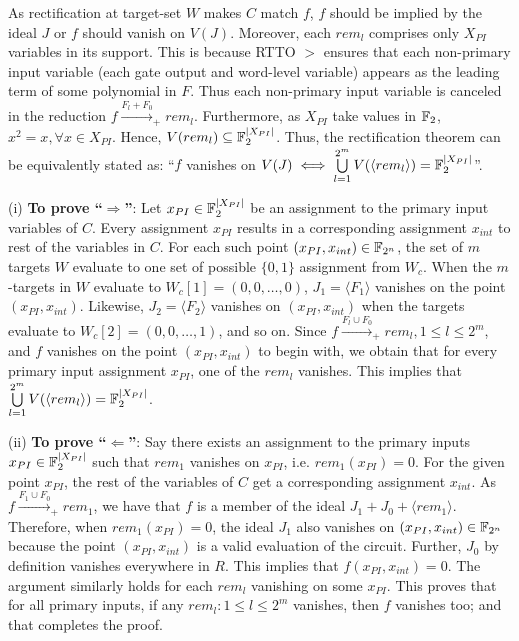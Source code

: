 \begin{Proof}
As rectification at target-set $W$ makes $C$ match $f$, 
$f$ should be implied by the ideal $J$ or 
$f$ should vanish on $V(J)$.
Moreover, each $rem_l$ comprises only $X_{PI}$ variables in its support. This is
because RTTO $>$ ensures that each non-primary input variable (each gate
output and word-level variable) appears as the leading term of some
polynomial in $F$. Thus each non-primary input variable is canceled
in the reduction $f\xrightarrow{F_l+ F_{0}}_+ rem_l$. Furthermore,
as $X_{PI}$ take values in ${\mathbb{F}}_2$, $x^2=x, \forall x \in
X_{PI}$. Hence, 
$V(rem_l) \subseteq {\mathbb{F}}_{2}^{|X_{PI}|}$. Thus, the rectification theorem
 can be equivalently stated as: ``$f$ vanishes on
$V(J) \iff \bigcup\limits_{l=1}^{2^m}V(\langle rem_l \rangle) = {\mathbb{F}}_{2}^{|X_{PI}|}$''.

(i) {\bf To prove ``$\Rightarrow$''}: Let $x_{PI} \in {\mathbb{F}}_{2}^{|X_{PI}|}$ be an
assignment to the primary input variables of $C$. Every assignment
$x_{PI}$ results in a corresponding assignment $x_{int}$ 
to rest of the variables in $C$. For each such point $(x_{PI},x_{int})\in {\mathbb{F}}_{2^n}$,
the set of $m$ targets $W$ evaluate to one set of possible $\{0,1\}$ assignment
from $W_c$. When the $m$-targets in $W$ evaluate to  $W_c[1] = (0,0,\dots,0)$,
$J_1 = \langle F_1 \rangle$ vanishes on the point $(x_{PI},x_{int})$. 
Likewise, $J_2 = \langle F_2 \rangle$ vanishes on $(x_{PI},x_{int})$ when the targets 
evaluate to $W_c[2] = (0,0,\dots,1)$, and so on. Since
$f\xrightarrow{F_l\cup F_0}_+rem_l,1 \leq l \leq 2^m$, and $f$ vanishes
on the point $(x_{PI},x_{int})$ to begin with, we obtain that for
every  primary input assignment $x_{PI}$, one of the $rem_l$ vanishes. This
implies that $ \bigcup\limits_{l=1}^{2^m}V(\langle rem_l\rangle) = {\mathbb{F}}_{2}^{|X_{PI}|}$.

(ii) {\bf To prove ``$\Leftarrow$''}: Say there exists an assignment to the
primary inputs $x_{PI} \in {\mathbb{F}}_{2}^{|X_{PI}|}$ such that $rem_1$ vanishes on
$x_{PI}$, i.e. $rem_1(x_{PI})=0$. For the given point $x_{PI}$, the rest of the variables 
of $C$ get a corresponding assignment $x_{int}$. 
As $f\xrightarrow{F_1\cup F_0}_+ rem_1$, we have that $f$ is a member of the
ideal $J_1 + J_0 + \langle rem_1 \rangle$. Therefore, when
$rem_1(x_{PI})=0$, the ideal $J_1$ also vanishes on $(x_{PI},x_{int}) \in {\mathbb{F}}_{2^n}$
because the point $(x_{PI},x_{int})$ is a valid evaluation of the circuit.
Further, $J_0$ by definition vanishes everywhere in $R$. This implies that
$f(x_{PI},x_{int})=0$. The argument similarly holds for each
$rem_{l}$ vanishing on some $x_{PI}$. This proves that for all primary
inputs, if any $rem_l:1 \leq l \leq 2^m$ vanishes, then $f$ vanishes too; and 
that completes the proof.
\end{Proof}

